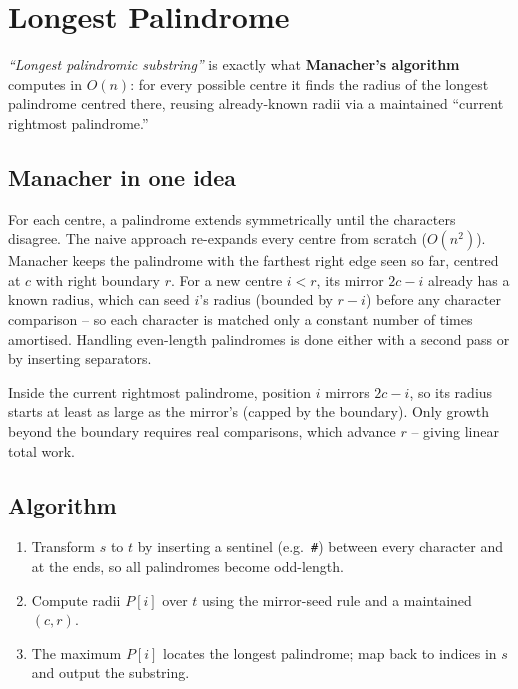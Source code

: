 \section{Longest Palindrome}
\label{sec:cses-longest-palindrome}


\begin{patternbox}
\emph{``Longest palindromic substring''} is exactly what \textbf{Manacher's
algorithm} computes in $O(n)$: for every possible centre it finds the
radius of the longest palindrome centred there, reusing already-known
radii via a maintained ``current rightmost palindrome.''
\end{patternbox}

\subsection*{Manacher in one idea}

For each centre, a palindrome extends symmetrically until the characters
disagree. The naive approach re-expands every centre from scratch
($O(n^2)$). Manacher keeps the palindrome with the farthest right edge
seen so far, centred at $c$ with right boundary $r$. For a new centre $i<r$,
its mirror $2c-i$ already has a known radius, which can seed $i$'s radius
(bounded by $r-i$) before any character comparison -- so each character is
matched only a constant number of times amortised. Handling even-length
palindromes is done either with a second pass or by inserting separators.

\begin{ideabox}
Inside the current rightmost palindrome, position $i$ mirrors $2c-i$, so
its radius starts at least as large as the mirror's (capped by the
boundary). Only growth beyond the boundary requires real comparisons,
which advance $r$ -- giving linear total work.
\end{ideabox}

\subsection*{Algorithm}

\begin{enumerate}
  \item Transform $s$ to $t$ by inserting a sentinel (e.g.\ \texttt{\#})
        between every character and at the ends, so all palindromes become
        odd-length.
  \item Compute radii $P[i]$ over $t$ using the mirror-seed rule and a
        maintained $(c,r)$.
  \item The maximum $P[i]$ locates the longest palindrome; map back to
        indices in $s$ and output the substring.
\end{enumerate}

